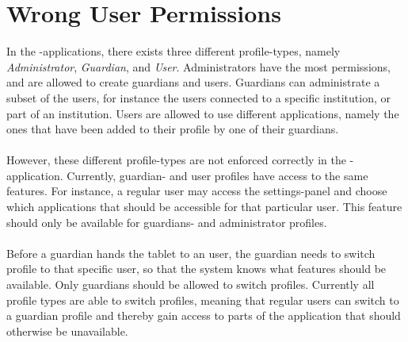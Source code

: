 \section{Wrong User Permissions}
\label{sec:wrong_user_permissions}

In the \giraf-applications, there exists three different profile-types, namely \emph{Administrator}, \emph{Guardian}, and \emph{User}. Administrators have the most permissions, and are allowed to create guardians and users. Guardians can administrate a subset of the users, for instance the users connected to a specific institution, or part of an institution. Users are allowed to use different applications, namely the ones that have been added to their profile by one of their guardians. 
\\\\
However, these different profile-types are not enforced correctly in the \launcher-application. Currently, guardian- and user profiles have access to the same features. For instance, a regular user may access the settings-panel and choose which applications that should be accessible for that particular user. This feature should only be available for guardians- and administrator profiles.
\\\\
Before a guardian hands the tablet to an user, the guardian needs to switch profile to that specific user, so that the system knows what features should be available. Only guardians should be allowed to switch profiles. Currently all profile types are able to switch profiles, meaning that regular users can switch to a guardian profile and thereby gain access to parts of the application that should otherwise be unavailable.